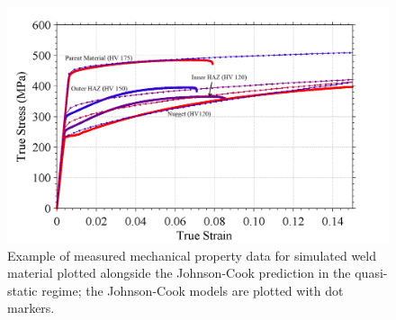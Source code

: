 	\begin{figure}
		\includegraphics[width=1\linewidth]{MechPropBridgmansaltered} \hfill
		\caption{Example of measured mechanical property data for simulated weld material plotted alongside the Johnson-Cook prediction in the quasi-static regime; the Johnson-Cook models are plotted with dot markers.}
		\label{fig:Mechprops}
	\end{figure}	
	\begin{table}[h!]
		\centering
		\caption{Johnson-Cook parameters fitted to experimentally measured mechanical properties in the weld.}
		\label{tab:Mechprops}
	\end{table}

